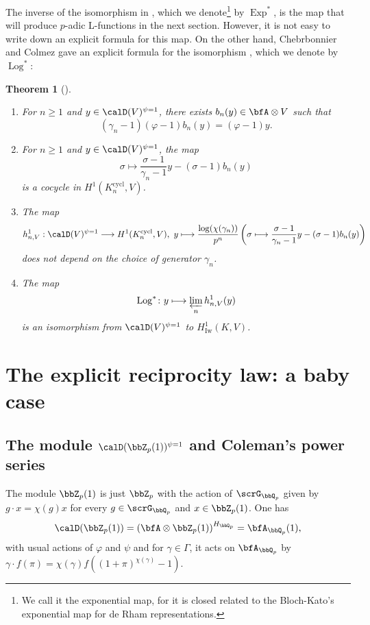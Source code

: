 \documentclass[a4paper,oneside]{amsart}
\let\opn\operatorname
\DeclareMathOperator{\cycl}{cycl}
\newcommand{\lto}{\longrightarrow}
\newcommand{\Iw}{\opn{Iw}}
\newtheorem{theorem}{Theorem}[section]
\numberwithin{equation}{section}
\begin{document}
The inverse of the isomorphism  in , which we denote\footnote{We call it the exponential map, for it is closed related to the Bloch-Kato's exponential map for de Rham representations.} by $\opn{Exp}^*$, is the map that will produce $p$-adic L-functions in the next section. However, it is not easy to write down an explicit formula for this map. On the other hand, Chebrbonnier and Colmez gave an explicit formula for the isomorphism , which we denote by $\opn{Log}^*$:
\begin{theorem}[{\cite[Section I.5, Th\'eor\`eme II.1.3]{cherbonnier_theorie_1999}}]\label{thm:28958}\leavevmode
    \begin{enumerate}
        \item For $n\geq 1$ and $y\in\calD(V)^{\psi=1}$, there exists $b_n(y)\in \bfA\otimes V$ such that $$(\gamma_n-1)(\varphi-1)b_n(y)=(\varphi-1)y.$$
        \item For $n\geq 1$ and $y\in\calD(V)^{\psi=1}$, the map
              $$\sigma\longmapsto \frac{\sigma-1}{\gamma_n-1}y-(\sigma-1)b_n(y)$$
              is a cocycle in $H^1(K_n^{\cycl},V)$.
        \item The map
              $$h_{n,V}^1:\calD(V)^{\psi=1}\lto H^1(K_n^{\cycl},V),\ y\longmapsto \frac{\log(\chi(\gamma_n))}{p^n}\left(\sigma\longmapsto \frac{\sigma-1}{\gamma_n-1}y-(\sigma-1)b_n(y)\right)$$
              does not depend on the choice of generator $\gamma_n$.
        \item The map $$\opn{Log}^*\colon y\longmapsto \varprojlim_n h_{n,V}^1(y)$$ is an isomorphism from $\calD(V)^{\psi=1}$ to $H_{\Iw}^1(K,V)$.
    \end{enumerate}
\end{theorem}
\section{The explicit reciprocity law: a baby case}
\subsection{The module $\calD(\bbZ_p(1))^{\psi=1}$ and Coleman's power series}
The module $\bbZ_p(1)$ is just $\bbZ_p$ with the action of $\scrG_{\bbQ_p}$ given by $g\cdot x=\chi(g)x$ for every $g\in\scrG_{\bbQ_p}$ and $x\in\bbZ_p(1)$. One has
$$\calD(\bbZ_p(1))=\left(\bfA\otimes\bbZ_p(1)\right)^{H_{\bbQ_p}}=\bfA_{\bbQ_p}(1),$$
with usual actions of $\varphi$ and $\psi$ and for $\gamma\in\Gamma$, it acts on $\bfA_{\bbQ_p}$ by $\gamma\cdot f(\pi)=\chi(\gamma)f((1+\pi)^{\chi(\gamma)}-1)$.
\end{document}
